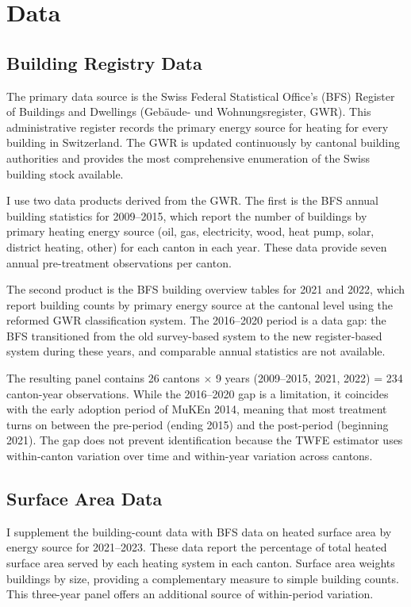 \documentclass[12pt]{article}
\begin{document}
\section{Data}

\subsection{Building Registry Data}

The primary data source is the Swiss Federal Statistical Office's (BFS) Register of Buildings and Dwellings (Geb\"aude- und Wohnungsregister, GWR). This administrative register records the primary energy source for heating for every building in Switzerland. The GWR is updated continuously by cantonal building authorities and provides the most comprehensive enumeration of the Swiss building stock available.

I use two data products derived from the GWR. The first is the BFS annual building statistics for 2009--2015, which report the number of buildings by primary heating energy source (oil, gas, electricity, wood, heat pump, solar, district heating, other) for each canton in each year. These data provide seven annual pre-treatment observations per canton.

The second product is the BFS building overview tables for 2021 and 2022, which report building counts by primary energy source at the cantonal level using the reformed GWR classification system. The 2016--2020 period is a data gap: the BFS transitioned from the old survey-based system to the new register-based system during these years, and comparable annual statistics are not available.

The resulting panel contains 26 cantons $\times$ 9 years (2009--2015, 2021, 2022) = 234 canton-year observations. While the 2016--2020 gap is a limitation, it coincides with the early adoption period of MuKEn 2014, meaning that most treatment turns on between the pre-period (ending 2015) and the post-period (beginning 2021). The gap does not prevent identification because the TWFE estimator uses within-canton variation over time and within-year variation across cantons.

\subsection{Surface Area Data}

I supplement the building-count data with BFS data on heated surface area by energy source for 2021--2023. These data report the percentage of total heated surface area served by each heating system in each canton. Surface area weights buildings by size, providing a complementary measure to simple building counts. This three-year panel offers an additional source of within-period variation.
\end{document}

